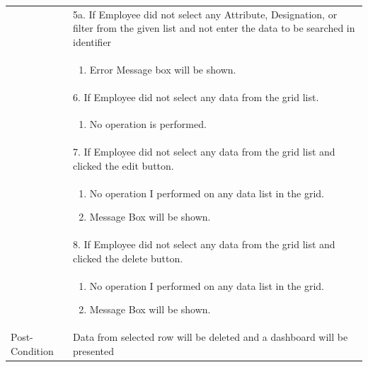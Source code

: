 \documentclass[12pt,a4paper]{article}
\begin{document}
\begin{longtable}{| p{3cm}|p{12cm}|}
& 5a. If Employee did not select any Attribute, Designation, or filter from the given list and not enter the data to be searched in identifier \\
& \begin{enumerate}
		\item Error Message box will be shown.
	\end{enumerate}
\\  
& 6. If Employee did not select any data from the grid list.  \\
& \begin{enumerate}
		\item No operation is performed.
	\end{enumerate}

\\
& 7. If Employee did not select any data from the grid list and clicked the edit button.\\
& \begin{enumerate}
		\item No operation I performed on any data list in the grid.
            \item Message Box will be shown.
	\end{enumerate}
\\
      & 8. If Employee did not select any data from the grid list and clicked the delete button.\\
 	&\begin{enumerate}
			\item No operation I performed on any data list in the grid.
            \item Message Box will be shown.
	\end{enumerate}
\\ \hline 


Post-Condition &  Data from selected row will be deleted and a dashboard will be presented  \\ \hline

\end{longtable}
\end{document}
